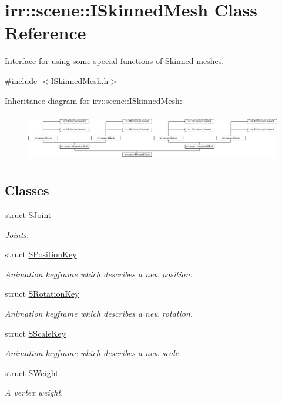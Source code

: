 \hypertarget{classirr_1_1scene_1_1ISkinnedMesh}{}\section{irr\+:\+:scene\+:\+:I\+Skinned\+Mesh Class Reference}
\label{classirr_1_1scene_1_1ISkinnedMesh}


Interface for using some special functions of Skinned meshes.  




{\ttfamily \#include $<$I\+Skinned\+Mesh.\+h$>$}

Inheritance diagram for irr\+:\+:scene\+:\+:I\+Skinned\+Mesh\+:\begin{figure}[H]
\begin{center}
\leavevmode
\includegraphics[height=2.121212cm]{classirr_1_1scene_1_1ISkinnedMesh}
\end{center}
\end{figure}
\subsection*{Classes}
\begin{DoxyCompactItemize}
\item 
struct \hyperlink{structirr_1_1scene_1_1ISkinnedMesh_1_1SJoint}{S\+Joint}
\begin{DoxyCompactList}\small\item\em Joints. \end{DoxyCompactList}\item 
struct \hyperlink{structirr_1_1scene_1_1ISkinnedMesh_1_1SPositionKey}{S\+Position\+Key}
\begin{DoxyCompactList}\small\item\em Animation keyframe which describes a new position. \end{DoxyCompactList}\item 
struct \hyperlink{structirr_1_1scene_1_1ISkinnedMesh_1_1SRotationKey}{S\+Rotation\+Key}
\begin{DoxyCompactList}\small\item\em Animation keyframe which describes a new rotation. \end{DoxyCompactList}\item 
struct \hyperlink{structirr_1_1scene_1_1ISkinnedMesh_1_1SScaleKey}{S\+Scale\+Key}
\begin{DoxyCompactList}\small\item\em Animation keyframe which describes a new scale. \end{DoxyCompactList}\item 
struct \hyperlink{structirr_1_1scene_1_1ISkinnedMesh_1_1SWeight}{S\+Weight}
\begin{DoxyCompactList}\small\item\em A vertex weight. \end{DoxyCompactList}\end{DoxyCompactItemize}
